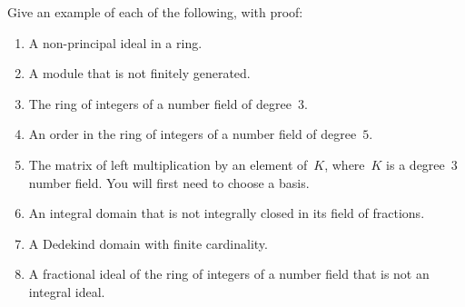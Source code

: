 \begin{exercise}
  Give an example of each of the following, with proof:
  \begin{enumerate}[label=(\alph*)]
    \item A non-principal ideal in a ring.
    \item A module that is not finitely generated.
    \item The ring of integers of a number field of degree~$3$.
    \item An order in the ring of integers of a number field of degree~$5$.
    \item The matrix of left multiplication by an element of~$K$,
    where~$K$ is a degree~$3$ number field.
    You will first need to choose a basis.
    \item An integral domain that is not integrally closed in its field
    of fractions.
    \item A Dedekind domain with finite cardinality.
    \item A fractional ideal of the ring of integers of a number
    field that is not an integral ideal.
  \end{enumerate}
\end{exercise}
